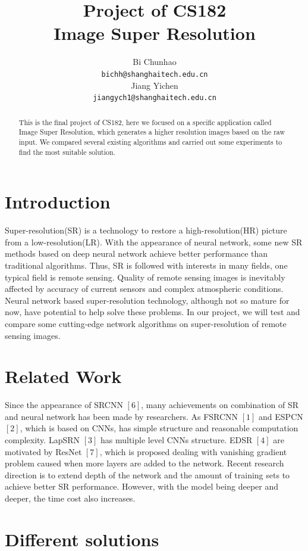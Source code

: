\documentclass{article}
\title{Project of CS182 \\ 
    Image Super Resolution }
\author{
    Bi Chunhao \\
    \texttt{bichh@shanghaitech.edu.cn} \\
    \And
    Jiang Yichen \\
    \texttt{jiangych1@shanghaitech.edu.cn} \\
}
\begin{document}
\maketitle

\begin{abstract}
    This is the final project of CS182, here we focused on a specific application called Image Super Resolution,
    which generates a higher resolution images based on the raw input. 
    We compared several existing algorithms and carried out some experiments to find the most suitable solution.
\end{abstract}

\section{Introduction}
Super-resolution(SR) is a technology to restore a high-resolution(HR) picture from a low-resolution(LR). 
With the appearance of neural network, some new SR methods based on deep neural network achieve better performance than traditional algorithms. 
Thus, SR is followed with interests in many fields, one typical field is remote sensing. 
Quality of remote sensing images is inevitably affected by accuracy of current sensors and complex atmospheric conditions. 
Neural network based super-resolution technology, although not so mature for now, have potential to help solve these problems. 
In our project, we will test and compare some cutting-edge network algorithms on super-resolution of remote sensing images. 
  
\section{Related Work}
  Since the appearance of SRCNN $[6]$, many achievements on combination of SR and neural network has been made by researchers. 
  As FSRCNN $[1]$ and ESPCN $[2]$, which is based on CNNs, has simple structure and reasonable computation complexity. 
  LapSRN $[3]$ has multiple level CNNs structure. 
  EDSR $[4]$ are motivated by ResNet $[7]$, which is proposed dealing with vanishing gradient problem caused when more layers are added to the network.
  Recent research direction is to extend depth of the network and the amount of training sets to achieve better SR performance.
  However, with the model being deeper and deeper, the time cost also increases.
  
  \section{Different solutions} 
\end{document}
